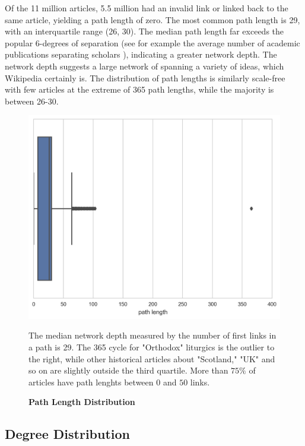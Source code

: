 \documentclass[pre,twocolumn,twoside,superscriptaddress,floatfix, aps, 10pt]{revtex4-1}
\begin{document}
Of the 11 million articles, 5.5 million had an invalid link or linked back to the same article, yielding a path length of zero. 
The most common path length is 29, with an interquartile range (26, 30).
The median path length far exceeds the popular 6-degrees of separation (see for 
example the average number of academic publications separating scholars 
\cite{six_degrees}), indicating a greater network depth. The network depth suggests a large network of spanning a variety of ideas, which Wikipedia certainly is.
The distribution of path lengths is similarly scale-free with few articles at the extreme of 365 path lengths, while the majority 
is between 26-30.  

\begin{figure}[tp!]
  \centering	
  \includegraphics[width=\columnwidth]{graphics/path_lengths_boxplot.png}
  \caption{
    \textbf{Path Length Distribution}
  }
  The median network depth measured by the number of first links in a path
  is 29. The 365 cycle for "Orthodox" liturgics is the outlier to the right, while
  other historical articles about "Scotland," "UK" and so on are slightly outside
  the third quartile. More than $75\%$ of articles have path lenghts between 
  $0$ and $50$ links.

  \label{fig:Path Length Distribution}
\end{figure}



\subsection{Degree Distribution}
\end{document}
